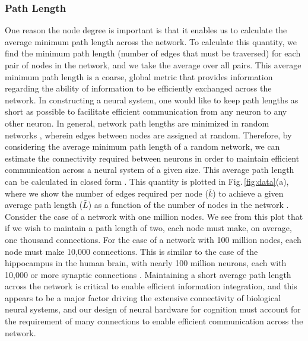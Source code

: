 \subsubsection{Path Length}
One reason the node degree is important is that it enables us to calculate the average minimum path length across the network. To calculate this quantity, we find the minimum path length (number of edges that must be traversed) for each pair of nodes in the network, and we take the average over all pairs. This average minimum path length is a coarse, global metric that provides information regarding the ability of information to be efficiently exchanged across the network. In constructing a neural system, one would like to keep path lengths as short as possible to facilitate efficient communication from any neuron to any other neuron. In general, network path lengths are minimized in random networks \cite{baal1999}, wherein edges between nodes are assigned at random. Therefore, by considering the average minimum path length of a random network, we can estimate the connectivity required between neurons in order to maintain efficient communication across a neural system of a given size. This average path length can be calculated in closed form \cite{frfr2004}. This quantity is plotted in Fig.\,\ref{fig:data}(a), where we show the number of edges required per node ($\bar{k}$) to achieve a given average path length ($\bar{L}$) as a function of the number of nodes in the network \cite{frfr2004}. Consider the case of a network with one million nodes. We see from this plot that if we wish to maintain a path length of two, each node must make, on average, one thousand connections. For the case of a network with 100 million nodes, each node must make 10,000 connections. This is similar to the case of the hippocampus in the human brain, with nearly 100 million neurons, each with 10,000 or more synaptic connections \cite{bu2006}. Maintaining a short average path length across the network is critical to enable efficient information integration, and this appears to be a major factor driving the extensive connectivity of biological neural systems, and our design of neural hardware for cognition must account for the requirement of many connections to enable efficient communication across the network.  
